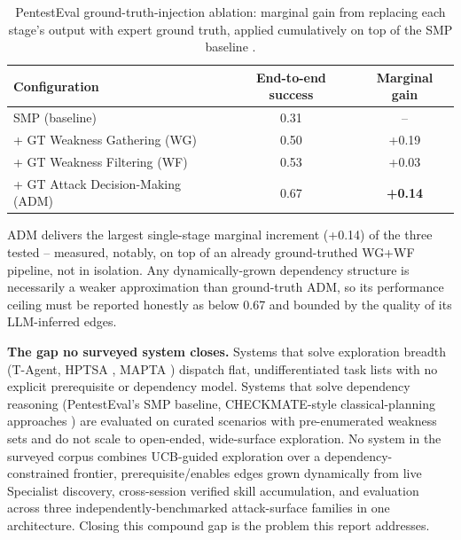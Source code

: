 \begin{table}[htbp]
\centering
\caption{PentestEval ground-truth-injection ablation: marginal gain from replacing each stage's output with expert ground truth, applied cumulatively on top of the SMP baseline \citep{yang2025pentesteval}.}
\label{tab:pentesteval-ablation}
\begin{tabular}{@{}lcc@{}}
\toprule
\textbf{Configuration} & \textbf{End-to-end success} & \textbf{Marginal gain} \\
\midrule
SMP (baseline)                          & 0.31 & --     \\
\quad + GT Weakness Gathering (WG)      & 0.50 & +0.19  \\
\quad + GT Weakness Filtering (WF)      & 0.53 & +0.03  \\
\quad + GT Attack Decision-Making (ADM) & 0.67 & \textbf{+0.14} \\
\bottomrule
\end{tabular}
\end{table}

ADM delivers the largest single-stage marginal increment (+0.14) of the three tested -- measured, notably, on top of an already ground-truthed WG+WF pipeline, not in isolation. Any dynamically-grown dependency structure is necessarily a weaker approximation than ground-truth ADM, so its performance ceiling must be reported honestly as below 0.67 and bounded by the quality of its LLM-inferred edges.

\textbf{The gap no surveyed system closes.} Systems that solve exploration breadth (T-Agent, HPTSA \citep{zhu2024hptsa}, MAPTA \citep{david2025mapta}) dispatch flat, undifferentiated task lists with no explicit prerequisite or dependency model. Systems that solve dependency reasoning (PentestEval's SMP baseline, CHECKMATE-style classical-planning approaches \citep{wang2025checkmate}) are evaluated on curated scenarios with pre-enumerated weakness sets and do not scale to open-ended, wide-surface exploration. No system in the surveyed corpus combines UCB-guided exploration over a dependency-constrained frontier, prerequisite/enables edges grown dynamically from live Specialist discovery, cross-session verified skill accumulation, and evaluation across three independently-benchmarked attack-surface families in one architecture. Closing this compound gap is the problem this report addresses.

